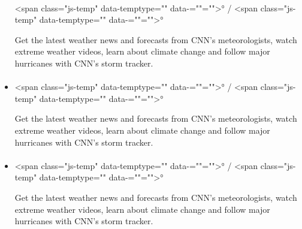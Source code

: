 \begin{itemize}
{  \paragraph{}\label{section-6}}

  \textless span class="js-temp" data-temptype=""
  data-=""=""\textgreater{}° / \textless span class="js-temp"
  data-temptype="" data-=""=""\textgreater{}°

  Get the latest weather news and forecasts from CNN's meteorologists,
  watch extreme weather videos, learn about climate change and follow
  major hurricanes with CNN's storm tracker.
\item
  \hypertarget{section-7}{%
  \paragraph{}\label{section-7}}

  \textless span class="js-temp" data-temptype=""
  data-=""=""\textgreater{}° / \textless span class="js-temp"
  data-temptype="" data-=""=""\textgreater{}°

  Get the latest weather news and forecasts from CNN's meteorologists,
  watch extreme weather videos, learn about climate change and follow
  major hurricanes with CNN's storm tracker.
\item
  \hypertarget{section-8}{%
  \paragraph{}\label{section-8}}

  \textless span class="js-temp" data-temptype=""
  data-=""=""\textgreater{}° / \textless span class="js-temp"
  data-temptype="" data-=""=""\textgreater{}°

  Get the latest weather news and forecasts from CNN's meteorologists,
  watch extreme weather videos, learn about climate change and follow
  major hurricanes with CNN's storm tracker.
\end{itemize}

